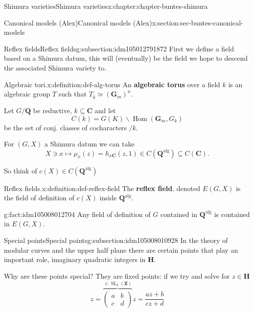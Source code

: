 \documentclass[oneside,10pt,]{book}
\newcommand{\terminology}[1]{\textbf{#1}}
\numberwithin{equation}{section}
\newcommand{\ZZ}{\mathbf{Z}}
\newcommand{\QQ}{\mathbf{Q}}
\newcommand{\CC}{\mathbf{C}}
\newcommand{\alg}{\mathrm{alg}}
\DeclareMathOperator{\Hom}{Hom}
\DeclareMathOperator{\SL}{SL}
\newcommand{\amp}{&}
\begin{document}
\begin{chapterptx}{Shimura varieties}{}{Shimura varieties}{}{}{x:chapter:chapter-buntes-shimura}
\begin{sectionptx}{Canonical models (Alex)}{}{Canonical models (Alex)}{}{}{x:section:sec-buntes-canonical-models}
%
\begin{subsectionptx}{Reflex fields}{}{Reflex fields}{}{}{g:subsection:idm105012791872}
First we define a field based on a Shimura datum, this will (eventually) be the field we hope to descend the associated Shimura variety to.%
\begin{definition}{Algebraic tori.}{x:definition:def-alg-torus}%
An \terminology{algebraic torus} over a field  \(k \) is an algebraic group \(T\) such that \(T_{\bar k} \simeq (\mathbf G_m)^n\).%
\end{definition}
Let \(G/\QQ\) be reductive, \(k \subseteq \CC\) and let%
\begin{equation*}
C(k) = G(K) \backslash \Hom(\mathbf G_m, G_k)
\end{equation*}
be the set of conj. classes of cocharacters \(/k\).%
\par
For \((G,X)\) a Shimura datum we can take%
\begin{equation*}
X \ni x \mapsto \mu_x(z) = h_{x\CC} (z,1) \in C(\QQ^\alg) \subseteq C(\CC)\text{.}
\end{equation*}
%
\par
So think of \(c(X) \in C(\QQ^\alg)\)%
\begin{definition}{Reflex fields.}{x:definition:def-reflex-field}%
The \terminology{reflex field}, denoted \(E(G,X)\) is the field of definition of \(c(X)\) inside \(\QQ^\alg\).%
\end{definition}
\begin{fact}{}{}{g:fact:idm105008012704}%
Any field of definition of \(G\) contained in \(\QQ^\alg\) is contained in \(E(G,X)\).%
\end{fact}
\end{subsectionptx}
%
%
\typeout{************************************************}
\typeout{************************************************}
%
\begin{subsectionptx}{Special points}{}{Special points}{}{}{g:subsection:idm105008010928}
In the theory of modular curves and the upper half plane there are certain points that play an important role, imaginary quadratic integers in \(\mathbf H\).%
\par
Why are these points special? They are fixed points: if we try and solve for \(z \in \mathbf H\)%
\begin{equation*}
z=  \overbrace{\begin{pmatrix} a\amp b \\ c \amp d\end{pmatrix}}^{\in \SL_2(\ZZ)} z = \frac{az + b}{cz+d}

\end{equation*}
\end{subsectionptx}
\end{sectionptx}
\end{chapterptx}
\end{document}
